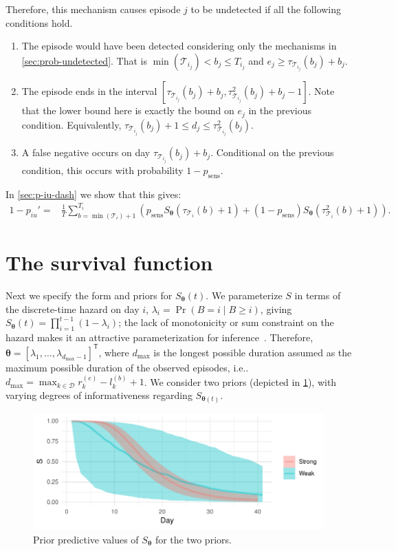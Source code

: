 \documentclass[12pt]{article}
\makeatletter
\DeclareMathOperator{\prob}{\mathrm{Pr}}
\newcommand\set{\mathcal}
\renewcommand{\vec}[1]{\bm{#1}}
\newcommand{\dmax}{d_\text{max}}
\newcommand{\psens}{p_\text{sens}}
\newcommand{\sched}{\mathcal{T}}
\DeclareRobustCommand\onedot{\futurelet\@let@token\@onedot}
\def\@onedot{\ifx\@let@token.\else.\null\fi\xspace}
\def\ie{i.e\onedot} \def\Ie{{I.e}\onedot}
\makeatother
\begin{document}
Therefore, this mechanism causes episode $j$ to be undetected if all the following conditions hold.
\begin{enumerate}
    \item The episode would have been detected considering only the mechanisms in \cref{sec:prob-undetected}. That is $\min(\sched_{i_j}) < b_j \leq T_{i_j}$ and $e_j \geq \tau_{\sched_{i_j}}(b_j) + b_j$.
    \item The episode ends in the interval $[\tau_{\sched_{i_j}}(b_j) + b_j, \tau^2_{\sched_{i_j}}(b_j) + b_j - 1]$.
      Note that the lower bound here is exactly the bound on $e_j$ in the previous condition.
      Equivalently, $\tau_{\sched_{i_j}}(b_j) + 1 \leq d_j \leq \tau^2_{\sched_{i_j}}(b_j)$.
    \item A false negative occurs on day $\tau_{\sched_{i_j}}(b_j) + b_j$. Conditional on the previous condition, this occurs with probability $1 - \psens$.
\end{enumerate}

In \cref{sec:p-iu-dash} we show that this gives:
\begin{align}
1 - p_{iu}'
=& \frac{1}{T} \sum_{b=\min(\sched_{i}) + 1}^{T_{i}} \left( p_\text{sens} S_{\vec{\theta}}(\tau_{\sched_{i}}(b) + 1) + (1 - p_\text{sens}) S_{\vec{\theta}}(\tau^2_{\sched_{i}}(b) + 1)\right).
\label{imperf-test:eq:pit-prime}
\end{align}

\section{The survival function} \label{sec:parameters-priors}

Next we specify the form and priors for $S_{\vec{\theta}}(t)$.
We parameterize $S$ in terms of the discrete-time hazard on day $i$, $\lambda_i = \prob(B = i \mid B \geq i)$, giving $S_{\vec{\theta}}(t) = \prod_{i=1}^{t-1} (1 - \lambda_{i})$; the lack of monotonicity or sum constraint on the hazard makes it an attractive parameterization for inference~\citep{heBayesian}.
Therefore, $\vec{\theta} = [\lambda_1, \dots, \lambda_{\dmax-1}]^{\mathsf{T}}$, where $\dmax$ is the longest possible duration assumed as the maximum possible duration of the observed episodes, \ie $\dmax = \max_{k \in \set{D}} r^{(e)}_k - l^{(b)}_k + 1$.
We consider two priors (depicted in \cref{fig:priors}), with varying degrees of informativeness regarding $S_{\vec{\theta}(t)}$.
\begin{figure}
  \includegraphics{figures/output/prior_predictive_survival}
  \caption{%
    Prior predictive values of $S_{\vec{\theta}}$ for the two priors.
  }
  \label{fig:priors}
\end{figure}
\end{document}
